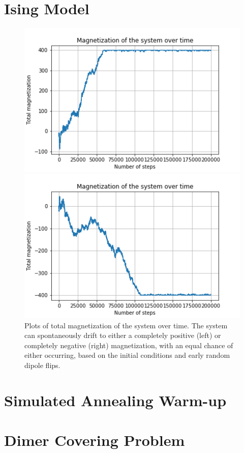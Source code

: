 \documentclass{article}
\begin{document}
\section{Ising Model}

\begin{figure}[H]
	\begin{minipage}{0.49\linewidth}
		\includegraphics[width=\linewidth]{../images/q2_magnetization_pos.png}
	\end{minipage}
	\begin{minipage}{0.49\linewidth}
		\includegraphics[width=\linewidth]{../images/q2_magnetization_neg.png}
	\end{minipage}
	\caption{Plots of total magnetization of the system over time. The system can spontaneously drift to either a completely positive (left) or completely negative (right) magnetization, with an equal chance of either occurring, based on the initial conditions and early random dipole flips.}
	\label{fig:q2_magnetization}
\end{figure}

\section{Simulated Annealing Warm-up}

\section{Dimer Covering Problem}
\end{document}
